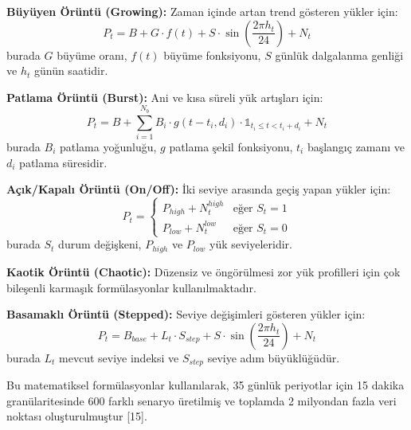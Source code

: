 \documentclass[12pt,a4paper]{article}
\begin{document}
\textbf{Büyüyen Örüntü (Growing):} Zaman içinde artan trend gösteren yükler için:
\begin{equation}
P_t = B + G \cdot f(t) + S \cdot \sin\left(\frac{2\pi h_t}{24}\right) + N_t
\end{equation}
burada $G$ büyüme oranı, $f(t)$ büyüme fonksiyonu, $S$ günlük dalgalanma genliği ve $h_t$ günün saatidir.

\textbf{Patlama Örüntü (Burst):} Ani ve kısa süreli yük artışları için:
\begin{equation}
P_t = B + \sum_{i=1}^{N_b} B_i \cdot g(t-t_i, d_i) \cdot \mathbb{1}_{t_i \leq t < t_i+d_i} + N_t
\end{equation}
burada $B_i$ patlama yoğunluğu, $g$ patlama şekil fonksiyonu, $t_i$ başlangıç zamanı ve $d_i$ patlama süresidir.

\textbf{Açık/Kapalı Örüntü (On/Off):} İki seviye arasında geçiş yapan yükler için:
\begin{equation}
P_t = \begin{cases}
P_{high} + N_t^{high} & \text{eğer } S_t = 1 \\
P_{low} + N_t^{low} & \text{eğer } S_t = 0
\end{cases}
\end{equation}
burada $S_t$ durum değişkeni, $P_{high}$ ve $P_{low}$ yük seviyeleridir.

\textbf{Kaotik Örüntü (Chaotic):} Düzensiz ve öngörülmesi zor yük profilleri için çok bileşenli karmaşık formülasyonlar kullanılmaktadır.

\textbf{Basamaklı Örüntü (Stepped):} Seviye değişimleri gösteren yükler için:
\begin{equation}
P_t = B_{base} + L_t \cdot S_{step} + S \cdot \sin\left(\frac{2\pi h_t}{24}\right) + N_t
\end{equation}
burada $L_t$ mevcut seviye indeksi ve $S_{step}$ seviye adım büyüklüğüdür.

Bu matematiksel formülasyonlar kullanılarak, 35 günlük periyotlar için 15 dakika granülaritesinde 600 farklı senaryo üretilmiş ve toplamda 2 milyondan fazla veri noktası oluşturulmuştur [15].
\end{document}
